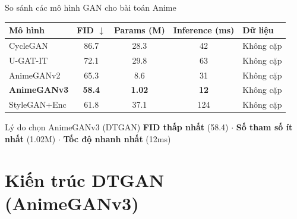 \documentclass[aspectratio=169,12pt]{beamer}
\begin{document}
\begin{frame}{So sánh các mô hình GAN cho bài toán Anime}
\begin{table}
\centering
\small
\begin{tabular}{lcccl}
\toprule
\textbf{Mô hình} & \textbf{FID $\downarrow$} & \textbf{Params (M)} & \textbf{Inference (ms)} & \textbf{Dữ liệu} \\
\midrule
CycleGAN & 86.7 & 28.3 & 42 & Không cặp \\
U-GAT-IT & 72.1 & 29.8 & 63 & Không cặp \\
AnimeGANv2 & 65.3 & 8.6 & 31 & Không cặp \\
\rowcolor{lightblue} \textbf{AnimeGANv3} & \textbf{58.4} & \textbf{1.02} & \textbf{12} & Không cặp \\
StyleGAN+Enc & 61.8 & 37.1 & 124 & Không cặp \\
\bottomrule
\end{tabular}
\end{table}

\vspace{0.2cm}
\begin{exampleblock}{Lý do chọn AnimeGANv3 (DTGAN)}
\textbf{FID thấp nhất} (58.4) $\cdot$ \textbf{Số tham số ít nhất} (1.02M) $\cdot$ \textbf{Tốc độ nhanh nhất} (12ms)
\end{exampleblock}
\end{frame}

\section{Kiến trúc DTGAN (AnimeGANv3)}
\end{document}
